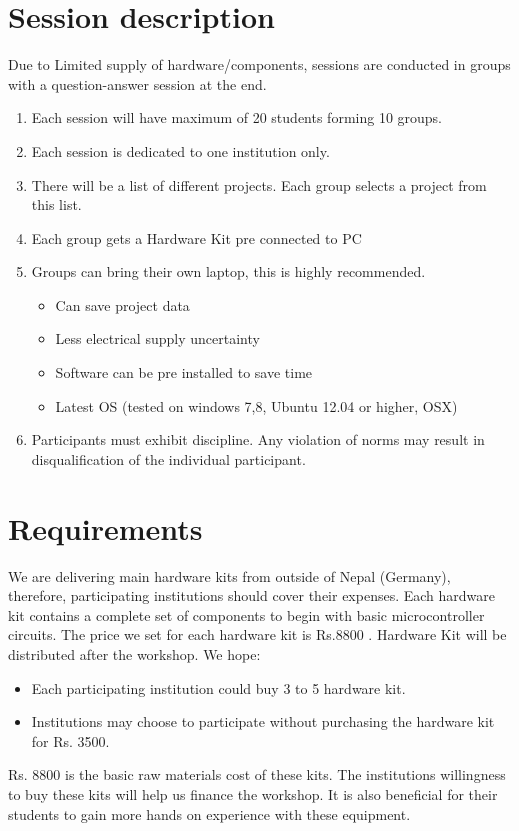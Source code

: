 \documentclass[12pt]{article} %
\begin{document}
\section{Session description} %
Due to Limited supply of hardware/components, sessions are conducted in groups with a question-answer session at the end.
\begin{enumerate}
\item Each session will have maximum of 20 students forming 10 groups.
\item Each session is dedicated to one institution only.
\item There will be a list of different projects. Each group selects a project from this list.  
\item Each group gets a Hardware Kit pre connected to PC 
\item Groups can bring their own laptop, this is highly recommended. 
	\begin{itemize}
	\item Can save project data
	\item Less electrical supply uncertainty
	\item Software can be pre installed to save time
	\item Latest OS (tested on windows 7,8, Ubuntu 12.04 or higher, OSX)
	\end{itemize}
\item Participants must exhibit discipline. Any violation of norms may result in disqualification of the individual participant.

\end{enumerate}

\section{Requirements} %
We are delivering main hardware kits from outside of Nepal (Germany), therefore, participating institutions should cover their expenses. Each hardware kit contains a complete set of components to begin with basic microcontroller circuits. The price we set for each hardware kit is Rs.8800 . Hardware Kit will be distributed after the workshop. We hope:
\begin{itemize}

\item Each participating institution could buy 3 to 5 hardware kit.
\item Institutions may choose to participate without purchasing the hardware kit for Rs. 3500.
\end{itemize}
Rs. 8800 is the basic raw materials cost of these kits. The institutions willingness to buy these kits will help us finance the workshop. It is also beneficial for their students to gain more hands on experience with these equipment.
\end{document}
